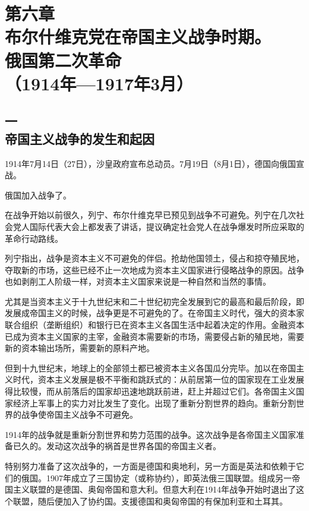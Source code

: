 \section[第六章\q 布尔什维克党在帝国主义战争时期。俄国第二次革命（1914年—1917年3月）]{第六章\\ 布尔什维克党在帝国主义战争时期。\\俄国第二次革命 \\{（1914年—1917年3月）}}

\subsection[一\q 帝国主义战争的发生和起因]{一\\帝国主义战争的发生和起因}

1914年7月14日（27日），沙皇政府宣布总动员。7月19日（8月1日），德国向俄国宣战。

俄国加入战争了。

在战争开始以前很久，列宁、布尔什维克早已预见到战争不可避免。列宁在几次社会党人国际代表大会上都发表了讲话，提议确定社会党人在战争爆发时所应采取的革命行动路线。

列宁指出，战争是资本主义不可避免的伴侣。抢劫他国领土，侵占和掠夺殖民地，夺取新的市场，这些已经不止一次地成为资本主义国家进行侵略战争的原因。战争也如剥削工人阶级一样，对资本主义国家来说是一种自然和当然的事情。

尤其是当资本主义于十九世纪末和二十世纪初完全发展到它的最高和最后阶段，即发展成帝国主义的时候，战争更是不可避免的了。在帝国主义时代，强大的资本家联合组织（垄断组织）和银行已在资本主义各国生活中起着决定的作用。金融资本已成为资本主义国家的主宰，金融资本需要新的市场，需要侵占新的殖民地，需要新的资本输出场所，需要新的原料产地。

但到十九世纪末，地球上的全部领土都已被资本主义各国瓜分完毕。加以在帝国主义时代，资本主义发展是极不平衡和跳跃式的：从前居第一位的国家现在工业发展得比较慢，而从前落后的国家却迅速地跳跃前进，赶上并超过它们。各帝国主义国家经济上军事上的实力对比发生了变化。出现了重新分割世界的趋向。重新分割世界的战争使帝国主义战争不可避免。

1914年的战争就是重新分割世界和势力范围的战争。这次战争是各帝国主义国家准备已久的。发动这次战争的祸首是世界各国的帝国主义者。

特别努力准备了这次战争的，一方面是德国和奥地利，另一方面是英法和依赖于它们的俄国。1907年成立了三国协定（或称协约），即英法俄三国联盟。组成另一帝国主义联盟的是德国、奥匈帝国和意大利。但意大利在1914年战争开始时退出了这个联盟，随后便加入了协约国。支援德国和奥匈帝国的有保加利亚和土耳其。

